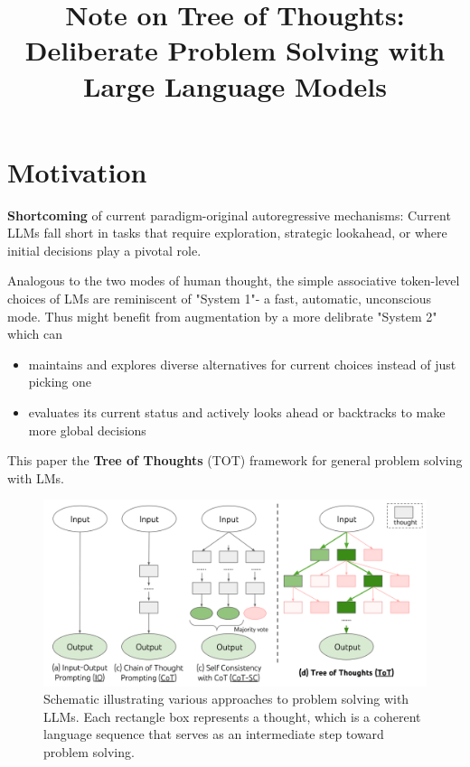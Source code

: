 \documentclass{article}
\title{Note on Tree of Thoughts: Deliberate Problem Solving with Large Language Models}
\begin{document}
\maketitle

\section{Motivation}

\textbf{Shortcoming} of current paradigm-original autoregressive mechanisms: Current LLMs 
fall short in tasks that require exploration, strategic lookahead, or where initial decisions 
play a pivotal role.

Analogous to the two modes of human thought, the simple associative token-level choices of 
LMs are reminiscent of "System 1"- a fast, automatic, unconscious mode. Thus might benefit from 
augmentation by a more delibrate "System 2" which can 

\begin{itemize}
    \item maintains and explores diverse alternatives for current choices instead of just picking one
    \item evaluates its current status and actively looks ahead or backtracks to make more global decisions
\end{itemize}

This paper the \textbf{Tree of Thoughts} (TOT) framework for general problem solving with LMs.

\begin{figure}[H]
    \centering
    \includegraphics[width=\textwidth]{./Images/Figure1.png}
    \caption{Schematic illustrating various approaches to problem solving with LLMs. Each rectangle box represents a thought, which is a coherent language sequence that serves as an intermediate step toward problem solving.}
    \label{fig:Figure1}
\end{figure}
\end{document}
